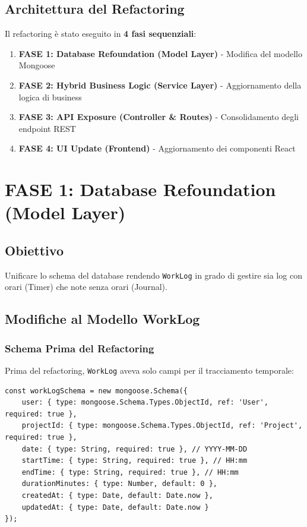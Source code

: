 \documentclass[11pt,a4paper]{article}
\begin{document}
\subsection{Architettura del Refactoring}

Il refactoring è stato eseguito in \textbf{4 fasi sequenziali}:

\begin{enumerate}
    \item \textbf{FASE 1: Database Refoundation (Model Layer)} - Modifica del modello Mongoose
    \item \textbf{FASE 2: Hybrid Business Logic (Service Layer)} - Aggiornamento della logica di business
    \item \textbf{FASE 3: API Exposure (Controller \& Routes)} - Consolidamento degli endpoint REST
    \item \textbf{FASE 4: UI Update (Frontend)} - Aggiornamento dei componenti React
\end{enumerate}

\section{FASE 1: Database Refoundation (Model Layer)}

\subsection{Obiettivo}

Unificare lo schema del database rendendo \texttt{WorkLog} in grado di gestire sia log con orari (Timer) che note senza orari (Journal).

\subsection{Modifiche al Modello WorkLog}

\subsubsection{Schema Prima del Refactoring}

Prima del refactoring, \texttt{WorkLog} aveva solo campi per il tracciamento temporale:

\begin{lstlisting}[caption=Schema WorkLog Originale]
const workLogSchema = new mongoose.Schema({
    user: { type: mongoose.Schema.Types.ObjectId, ref: 'User', required: true },
    projectId: { type: mongoose.Schema.Types.ObjectId, ref: 'Project', required: true },
    date: { type: String, required: true }, // YYYY-MM-DD
    startTime: { type: String, required: true }, // HH:mm
    endTime: { type: String, required: true }, // HH:mm
    durationMinutes: { type: Number, default: 0 },
    createdAt: { type: Date, default: Date.now },
    updatedAt: { type: Date, default: Date.now }
});
\end{lstlisting}
\end{document}
